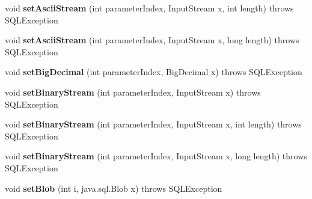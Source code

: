 \begin{DoxyCompactItemize}
\item 
\mbox{\label{classcom_1_1mysql_1_1cj_1_1jdbc_1_1_client_prepared_statement_afd89b596b5eab95ead48a3706b747cc2}} 
void {\bfseries set\+Ascii\+Stream} (int parameter\+Index, Input\+Stream x, int length)  throws S\+Q\+L\+Exception 
\item 
\mbox{\label{classcom_1_1mysql_1_1cj_1_1jdbc_1_1_client_prepared_statement_a15235fb242787097c5685a9ec5cfb42a}} 
void {\bfseries set\+Ascii\+Stream} (int parameter\+Index, Input\+Stream x, long length)  throws S\+Q\+L\+Exception 
\item 
\mbox{\label{classcom_1_1mysql_1_1cj_1_1jdbc_1_1_client_prepared_statement_aa69c4988a1606ee1891a85199449e3ca}} 
void {\bfseries set\+Big\+Decimal} (int parameter\+Index, Big\+Decimal x)  throws S\+Q\+L\+Exception 
\item 
\mbox{\label{classcom_1_1mysql_1_1cj_1_1jdbc_1_1_client_prepared_statement_a29d1abb3aacb4e8e31bdfdf3684703e0}} 
void {\bfseries set\+Binary\+Stream} (int parameter\+Index, Input\+Stream x)  throws S\+Q\+L\+Exception 
\item 
\mbox{\label{classcom_1_1mysql_1_1cj_1_1jdbc_1_1_client_prepared_statement_a3d140af9e31f60bb5dd494acfcd2b757}} 
void {\bfseries set\+Binary\+Stream} (int parameter\+Index, Input\+Stream x, int length)  throws S\+Q\+L\+Exception 
\item 
\mbox{\label{classcom_1_1mysql_1_1cj_1_1jdbc_1_1_client_prepared_statement_a4cfe34988990d5fda641ebe59cc51880}} 
void {\bfseries set\+Binary\+Stream} (int parameter\+Index, Input\+Stream x, long length)  throws S\+Q\+L\+Exception 
\item 
\mbox{\label{classcom_1_1mysql_1_1cj_1_1jdbc_1_1_client_prepared_statement_ad0b80b80ac330a7dcd4826a33029eb12}} 
void {\bfseries set\+Blob} (int i, java.\+sql.\+Blob x)  throws S\+Q\+L\+Exception 

\end{DoxyCompactItemize}
